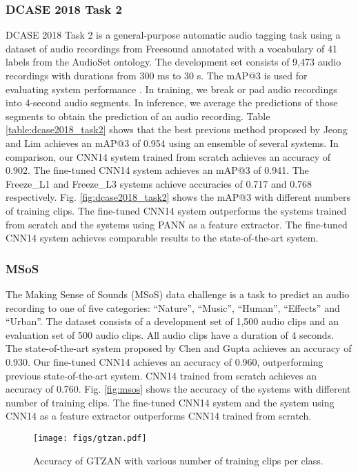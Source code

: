 \documentclass[journal]{IEEEtran}
\newcommand{\qk}[1] {{\color{black} #1}}
\begin{document}
\subsubsection{DCASE 2018 Task 2}
DCASE 2018 Task 2 is a general-purpose automatic audio tagging task \cite{Fonseca2018_DCASE} using a dataset of audio recordings from Freesound annotated with a vocabulary of 41 labels from the AudioSet ontology. The development set consists of 9,473 audio recordings with durations from 300 ms to 30 s. The mAP@3 is used for evaluating system performance \cite{Fonseca2018_DCASE}. \qk{In training, we break or pad audio recordings into 4-second audio segments. In inference, we average the predictions of those segments to obtain the prediction of an audio recording.} Table \ref{table:dcase2018_task2} shows that the best previous method proposed by Jeong and Lim \cite{jeong2018audio} achieves an mAP@3 of 0.954 using an ensemble of several systems. In comparison, our CNN14 system trained from scratch achieves an accuracy of 0.902. The fine-tuned CNN14 system achieves an mAP@3 of 0.941. The Freeze\_L1 and Freeze\_L3 systems achieve accuracies of 0.717 and 0.768 respectively. Fig. \ref{fig:dcase2018_task2} shows the mAP@3 with different numbers of training clips. The fine-tuned CNN14 system outperforms the systems trained from scratch and the systems using PANN as a feature extractor. The fine-tuned CNN14 system achieves comparable results to the state-of-the-art system.


\subsubsection{MSoS}
The Making Sense of Sounds (MSoS) data challenge \cite{kroos2019generalisation} is a task to predict an audio recording to one of five categories: ``Nature'', ``Music'', ``Human'', ``Effects'' and ``Urban''. The dataset consists of a development set of 1,500 audio clips and an evaluation set of 500 audio clips. All audio clips have a duration of 4 seconds. The state-of-the-art system proposed by Chen and Gupta \cite{chenattention} achieves an accuracy of 0.930. Our fine-tuned CNN14 achieves an accuracy of 0.960, outperforming previous state-of-the-art system. CNN14 trained from scratch achieves an accuracy of 0.760. Fig. \ref{fig:msos} shows the accuracy of the systems with different number of training clips. The fine-tuned CNN14 system and the system using CNN14 as a feature extractor outperforms CNN14 trained from scratch. 

\begin{figure}[t]
  \centering
  \centerline{\texttt{[image: figs/gtzan.pdf]}}
  \caption{Accuracy of GTZAN with various number of training clips per class.}
  \label{fig:gtzan}
\end{figure}
\end{document}
